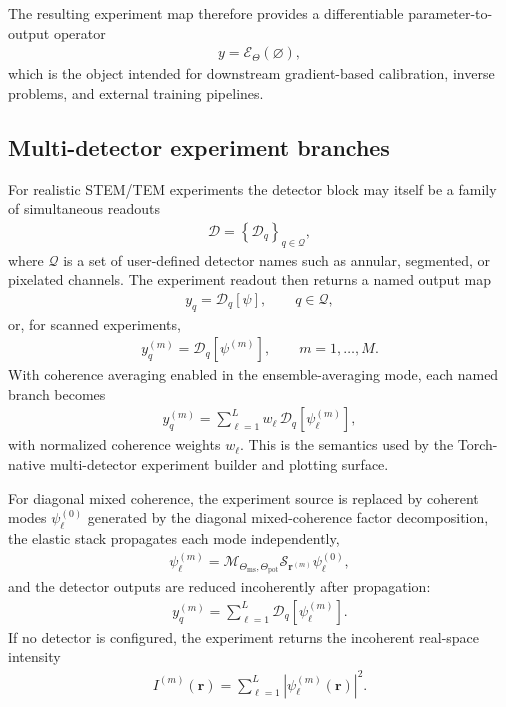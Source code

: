 \documentclass[11pt]{article}
\begin{document}
The resulting experiment map therefore provides a differentiable parameter-to-output
operator
\begin{align}
  y = \mathcal{E}_{\Theta}(\varnothing),
\end{align}
which is the object intended for downstream gradient-based calibration, inverse
problems, and external training pipelines.

\subsection{Multi-detector experiment branches}
For realistic STEM/TEM experiments the detector block may itself be a family of
simultaneous readouts
\begin{align}
  \mathcal{D}
  = \left\{
    \mathcal{D}_q
  \right\}_{q \in \mathcal{Q}},
\end{align}
where $\mathcal{Q}$ is a set of user-defined detector names such as annular,
segmented, or pixelated channels.  The experiment readout then returns a named output
map
\begin{align}
  y_q = \mathcal{D}_q[\psi],
  \qquad q \in \mathcal{Q},
\end{align}
or, for scanned experiments,
\begin{align}
  y_q^{(m)} = \mathcal{D}_q[\psi^{(m)}],
  \qquad m=1,\dots,M.
\end{align}
With coherence averaging enabled in the ensemble-averaging mode, each named branch becomes
\begin{align}
  y_q^{(m)}
  = \sum_{\ell=1}^{L} w_\ell \,
    \mathcal{D}_q\!\left[\psi_\ell^{(m)}\right],
\end{align}
with normalized coherence weights $w_\ell$.  This is the semantics used by the
Torch-native multi-detector experiment builder and plotting surface.

For diagonal mixed coherence, the experiment source is replaced by coherent modes
$\psi_\ell^{(0)}$ generated by the diagonal mixed-coherence factor decomposition,
the elastic stack propagates each mode independently,
\begin{align}
  \psi_\ell^{(m)}
  = \mathcal{M}_{\Theta_{\mathrm{ms}},\Theta_{\mathrm{pot}}}
    \mathcal{S}_{\mathbf{r}^{(m)}} \psi_\ell^{(0)},
\end{align}
and the detector outputs are reduced incoherently after propagation:
\begin{align}
  y_q^{(m)}
  = \sum_{\ell=1}^{L}
    \mathcal{D}_q\!\left[\psi_\ell^{(m)}\right].
\end{align}
If no detector is configured, the experiment returns the incoherent real-space intensity
\begin{align}
  I^{(m)}(\mathbf{r})
  = \sum_{\ell=1}^{L} \left|\psi_\ell^{(m)}(\mathbf{r})\right|^2.
\end{align}
\end{document}
